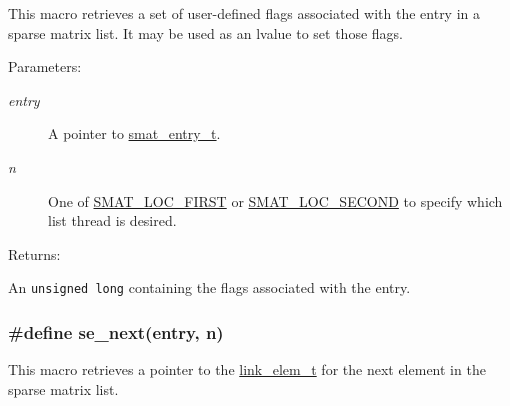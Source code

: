 This macro retrieves a set of user-defined flags associated with the entry in a sparse matrix list. It may be used as an lvalue to set those flags.\begin{Desc}
\item[Parameters: ]\par
\begin{description}
\item[{\em 
entry}]A pointer to \hyperlink{group__dbprim__smat_a2}{smat\_\-entry\_\-t}. \item[{\em 
n}]One of \hyperlink{group__dbprim__smat_a47a135}{SMAT\_\-LOC\_\-FIRST} or \hyperlink{group__dbprim__smat_a47a136}{SMAT\_\-LOC\_\-SECOND} to specify which list thread is desired.\end{description}
\end{Desc}
\begin{Desc}
\item[Returns: ]\par
An {\tt unsigned long} containing the flags associated with the entry. \end{Desc}
\hypertarget{group__dbprim__smat_a43}{
\subsubsection[se\_\-next]{\setlength{\rightskip}{0pt plus 5cm}\#define se\_\-next(entry, n)}}
\label{group__dbprim__smat_a43}


This macro retrieves a pointer to the \hyperlink{group__dbprim__link_a1}{link\_\-elem\_\-t} for the next element in the sparse matrix list.

